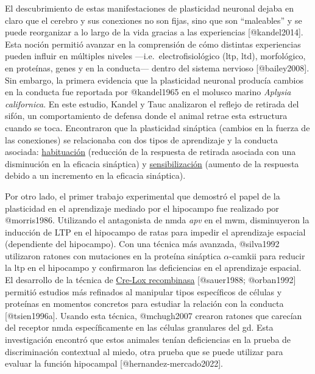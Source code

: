 \documentclass[
  11pt]{../MastersDoctoralThesisUNAM}
\begin{document}
El descubrimiento de estas manifestaciones de plasticidad neuronal
dejaba en claro que el cerebro y sus conexiones no son fijas, sino que
son ``maleables'' y se puede reorganizar a lo largo de la vida gracias a
las experiencias {[}@kandel2014{]}. Esta noción permitió avanzar en la
comprensión de cómo distintas experiencias pueden influir en múltiples
niveles ---i.e.~electrofisiológico (\ac{ltp}, \ac{ltd}), morfológico, en
proteínas, genes y en la conducta--- dentro del sistema nervioso
{[}@bailey2008{]}. Sin embargo, la primera evidencia que la plasticidad
neuronal producía cambios en la conducta fue reportada por @kandel1965
en el molusco marino \emph{Aplysia californica}. En este estudio, Kandel
y Tauc analizaron el reflejo de retirada del sifón, un comportamiento de
defensa donde el animal retrae esta estructura cuando se toca.
Encontraron que la plasticidad sináptica (cambios en la fuerza de las
conexiones) se relacionaba con dos tipos de aprendizaje y la conducta
asociada: \href{AppendixB.qmd\#term-id-55}{habituación} (reducción de la
respuesta de retirada asociada con una disminución en la eficacia
sináptica) y \href{AppendixB.qmd\#term-id-56}{sensibilización} (aumento
de la respuesta debido a un incremento en la eficacia sináptica).

Por otro lado, el primer trabajo experimental que demostró el papel de
la plasticidad en el aprendizaje mediado por el hipocampo fue realizado
por @morris1986. Utilizando el antagonista de \ac{nmda} \emph{\ac{apv}}
en el \ac{mwm}, disminuyeron \colorbox{BurntOrange}{la inducción de LTP}
 en el hipocampo de
ratas para impedir el aprendizaje espacial (dependiente del hipocampo).
Con una técnica más avanzada, @silva1992 utilizaron ratones con
mutaciones en la proteína sináptica \(\alpha\)-\ac{camkii} para reducir
la \ac{ltp} en el hipocampo y confirmaron las deficiencias en el
aprendizaje espacial. El desarrollo de la técnica de
\href{AppendixB.qmd\#term-id-69}{Cre-Lox recombinasa} {[}@sauer1988;
@orban1992{]} permitió estudios más refinados al manipular tipos
específicos de células y proteínas en momentos concretos para estudiar
la relación con la conducta {[}@tsien1996a{]}. Usando esta técnica,
@mchugh2007 crearon ratones que carecían del receptor \ac{nmda}
específicamente en las células granulares del \ac{gd}. Esta
investigación encontró que estos animales tenían deficiencias en la
prueba de discriminación contextual al miedo, otra prueba que se puede
utilizar para evaluar la función hipocampal
{[}@hernandez-mercado2022{]}.
\end{document}
